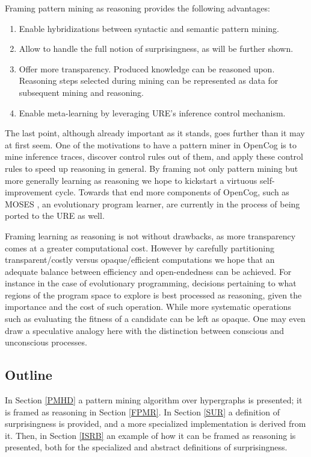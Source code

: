\documentclass[runningheads]{llncs}
\begin{document}
Framing pattern mining as reasoning provides the following
advantages:
\begin{enumerate}
\item Enable hybridizations between syntactic and semantic pattern
  mining.
\item Allow to handle the full notion of surprisingness, as will be
  further shown.
\item Offer more transparency. Produced knowledge can be reasoned
  upon. Reasoning steps selected during mining can be represented as
  data for subsequent mining and reasoning.
\item Enable meta-learning by leveraging URE's inference control
  mechanism.
\end{enumerate}
The last point, although already important as it stands, goes further
than it may at first seem. One of the motivations to have a pattern miner in OpenCog
is to mine inference traces, discover control rules out of them, and
apply these control rules to speed up reasoning in general. By framing
not only pattern mining but more generally learning as reasoning we
hope to kickstart a virtuous self-improvement cycle. Towards that end
more components of OpenCog, such as MOSES
\cite{Looks06abstractcompetent}, an evolutionary program learner, are
currently in the process of being ported to the URE as well.

Framing learning as reasoning is not without drawbacks, as more
transparency comes at a greater computational cost. However by
carefully partitioning transparent/costly versus opaque/efficient
computations we hope that an adequate balance between efficiency and
open-endedness can be achieved. For instance in the case of
evolutionary programming, decisions pertaining to what regions of the
program space to explore is best processed as reasoning, given the
importance and the cost of such operation. While more systematic
operations such as evaluating the fitness of a candidate can be left
as opaque. One may even draw a speculative analogy here with the distinction
between conscious and unconscious processes.

\subsection{Outline}

In Section \ref{PMHD} a pattern mining algorithm over hypergraphs is
presented; it is framed as reasoning in Section \ref{FPMR}. In Section
\ref{SUR} a definition of surprisingness is provided, and a more
specialized implementation is derived from it. Then, in Section
\ref{ISRB} an example of how it can be framed as reasoning is
presented, both for the specialized and abstract definitions of
surprisingness.
\end{document}
